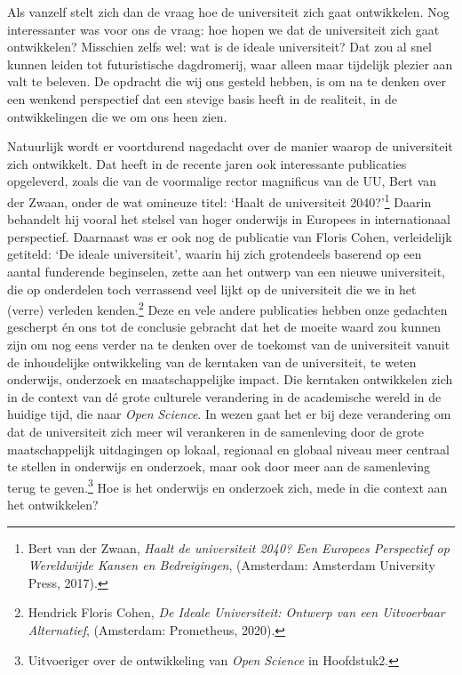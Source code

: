 \documentclass[smallauthor, chapterhaspagenum, nochapterinheader, pagenuminheader,  bigchapnum,medium2, tocpages,  garamond, titleinheader]{jote-book}
\begin{document}
	Als vanzelf stelt zich dan de vraag hoe de universiteit zich gaat ontwikkelen. Nog interessanter was voor ons de vraag: hoe hopen we dat de universiteit zich gaat ontwikkelen? Misschien zelfs wel: wat is de ideale universiteit? Dat zou al snel kunnen leiden tot futuristische dagdromerij, waar alleen maar tijdelijk plezier aan valt te beleven. De opdracht die wij ons gesteld hebben, is om na te denken over een wenkend perspectief dat een stevige basis heeft in de realiteit, in de ontwikkelingen die we om ons heen zien.







	Natuurlijk wordt er voortdurend nagedacht over de manier waarop de universiteit zich ontwikkelt. Dat heeft in de recente jaren ook interessante publicaties opgeleverd, zoals die van de voormalige rector magnificus van de UU, Bert van der Zwaan, onder de wat omineuze titel: ‘Haalt de universiteit 2040?'\footnote{Bert van der Zwaan, \emph{Haalt de universiteit 2040? Een Europees Perspectief op Wereldwijde Kansen en Bedreigingen}, (Amsterdam: Amsterdam University Press, 2017).} Daarin behandelt hij vooral het stelsel van hoger onderwijs in Europees in internationaal perspectief. Daarnaast was er ook nog de publicatie van Floris Cohen, verleidelijk getiteld: ‘De ideale universiteit', waarin hij zich grotendeels baserend op een aantal funderende beginselen, zette aan het ontwerp van een nieuwe universiteit, die op onderdelen toch verrassend veel lijkt op de universiteit die we in het (verre) verleden kenden.\footnote{Hendrick Floris Cohen, \emph{De Ideale Universiteit: Ontwerp van een Uitvoerbaar Alternatief},\emph{ }(Amsterdam: Prometheus, 2020).} Deze en vele andere publicaties hebben onze gedachten gescherpt én ons tot de conclusie gebracht dat het de moeite waard zou kunnen zijn om nog eens verder na te denken over de toekomst van de universiteit vanuit de inhoudelijke ontwikkeling van de kerntaken van de universiteit, te weten onderwijs, onderzoek en maatschappelijke impact. Die kerntaken ontwikkelen zich in de context van dé grote culturele verandering in de academische wereld in de huidige tijd, die naar \emph{Open }\emph{Science}. In wezen gaat het er bij deze verandering om dat de universiteit zich meer wil verankeren in de samenleving door de grote maatschappelijk uitdagingen op lokaal, regionaal en globaal niveau meer centraal te stellen in onderwijs en onderzoek, maar ook door meer aan de samenleving terug te geven.\footnote{Uitvoeriger over de ontwikkeling van \emph{Open }\emph{Science} in Hoofdstuk2.} Hoe is het onderwijs en onderzoek zich, mede in die context aan het ontwikkelen?
\end{document}

